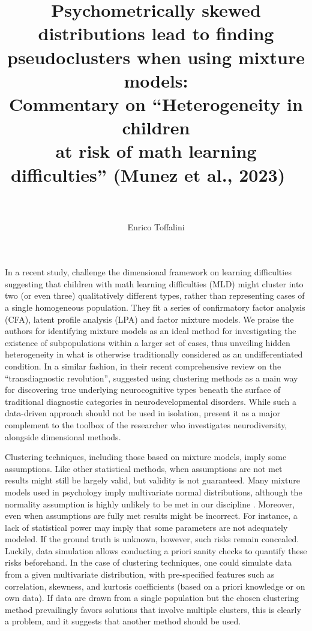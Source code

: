 \documentclass[letterpaper,11pt]{article}
\title{%
  \LARGE Psychometrically skewed distributions lead to finding pseudoclusters when using mixture models: \\ 
   \Large Commentary on “Heterogeneity in children \\ at risk of math learning difficulties” \large (Munez et al., 2023) 
  \ \\
  \ \\
}
\author{Enrico Toffalini}
\affil{Department of General Psychology, University of Padova, Italy}
\begin{document}
\maketitle
\newpage

In a recent study,  challenge the dimensional framework on learning difficulties suggesting that children with math learning difficulties (MLD) might cluster into two (or even three) qualitatively different types, rather than representing cases of a single homogeneous population. They fit a series of confirmatory factor analysis (CFA), latent profile analysis (LPA) and factor mixture models. We praise the authors for identifying mixture models as an ideal method for investigating the existence of subpopulations within a larger set of cases, thus unveiling hidden heterogeneity in what is otherwise traditionally considered as an undifferentiated condition. In a similar fashion, in their recent comprehensive review on the “transdiagnostic revolution”,  suggested using clustering methods as a main way for discovering true underlying neurocognitive types beneath the surface of traditional diagnostic categories in neurodevelopmental disorders. While such a data-driven approach should not be used in isolation,  present it as a major complement to the toolbox of the researcher who investigates neurodiversity, alongside dimensional methods.

Clustering techniques, including those based on mixture models, imply some assumptions. Like other statistical methods, when assumptions are not met results might still be largely valid, but validity is not guaranteed. Many mixture models used in psychology imply multivariate normal distributions, although the normality assumption is highly unlikely to be met in our discipline \cite{micceri1989unicorn}. Moreover, even when assumptions are fully met results might be incorrect. For instance, a lack of statistical power may imply that some parameters are not adequately modeled. If the ground truth is unknown, however, such risks remain concealed. Luckily, data simulation allows conducting a priori sanity checks to quantify these risks beforehand. In the case of clustering techniques, one could simulate data from a given multivariate distribution, with pre-specified features such as correlation, skewness, and kurtosis coefficients (based on a priori knowledge or on own data). If data are drawn from a single population but the chosen clustering method prevailingly favors solutions that involve multiple clusters, this is clearly a problem, and it suggests that another method should be used. 
\end{document}
